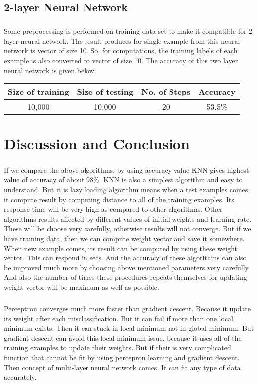 \documentclass[]{report}
\begin{document}
\section{2-layer Neural Network}
\paragraph{}Some preprocessing is performed on training data set to make it compatible for 2-layer neural network. The result produces for single example from this neural network  is vector of size 10. So, for computations, the training labels of each example is also converted to vector of size 10. The accuracy of this two layer neural network is given below:  
\begin{center}
	\begin{tabular}{||c c c c||} 
		\hline
		Size of training & Size of testing &No. of Steps& Accuracy\\ [0.5ex] 
		\hline\hline
		10,000 & 10,000 &20& 53.5\%\\ 
		[1ex] 
		\hline
	\end{tabular}
\end{center}
\chapter{Discussion and Conclusion}
\paragraph{}If we compare the above algorithms, by using accuracy value KNN gives highest value of accuracy of about 98\%. KNN is also a simplest algorithm and easy to understand. But it is lazy loading algorithm means when a test examples comes it compute result by computing distance to all of the training examples. Its response time will be very high as compared to other algorithms. Other algorithms results affected by different values of initial weights and learning rate. These will be choose very carefully, otherwise results will not converge. But if we have training data, then we can compute weight vector and save it somewhere. When new example comes, its result can be computed by using these weight vector. This can respond in secs. And the accuracy of these algorithms can also be improved much more by choosing above mentioned parameters very carefully. And also the number of times these procedures repeats themselves for updating weight vector will be maximum as well as possible. 
\paragraph{} Perceptron converges much more faster than gradient descent. Because it update its weight after each misclassification. But it can fail if more than one local minimum exists. Then it can stuck in local minimum not in global minimum. But gradient descent can avoid this local minimum issue, because it uses all of the training examples to update their weights. But if their is very complicated function that cannot be fit by using percepron learning and gradient descent. Then concept of multi-layer neural network comes. It can fit any type of data accurately. 
\end{document}

